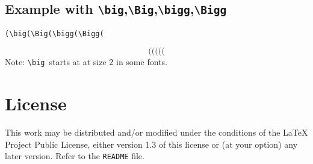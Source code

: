 \documentclass[12pt,a4paper,british]{scrartcl}
\begin{document}
\subsection{Example with \texttt{\textbackslash{}big},\texttt{\textbackslash{}Big},\texttt{\textbackslash{}bigg},\texttt{\textbackslash{}Bigg}}

\texttt{\footnotesize{(\textbackslash{}big(\textbackslash{}Big(\textbackslash{}bigg(\textbackslash{}Bigg(}}{\footnotesize \par}

\[
(\big(\Big(\bigg(\Bigg(
\]
Note: \texttt{\textbackslash{}big}\texttt{\footnotesize{ }}starts
at at size 2 in some fonts.


\section{License}

This work may be distributed and/or modified under the conditions
of the \LaTeX{} Project Public License, either version 1.3 of this
license or (at your option) any later version. Refer to the \texttt{README}
file.
\end{document}
